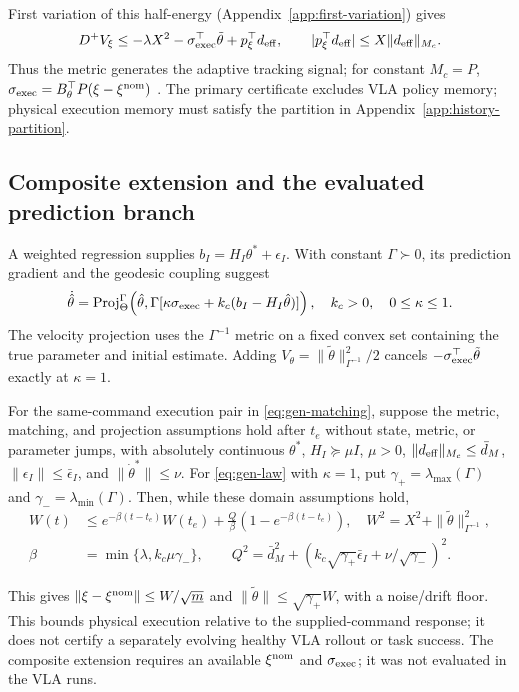 First variation of this half-energy (Appendix~\ref{app:first-variation})
gives
\begin{equation}
 D^+V_\xi\le-\lambda X^2-\sigma_{\rm exec}^\top\tilde\theta
                  +p_\xi^\top d_{\rm eff},\qquad
 |p_\xi^\top d_{\rm eff}|\le X\|d_{\rm eff}\|_{M_c}.
 \label{eq:gen-storage}
\end{equation}
Thus the metric generates the adaptive tracking signal; for constant
$M_c=P$, $\sigma_{\rm exec}=B_\theta^\top P(\xi-\xi^{\rm nom})$
\citep{lopez2020adaptivecontraction,tsukamoto2021adaptivecontraction}.
The primary certificate excludes VLA policy memory; physical execution
memory must satisfy the partition in Appendix~\ref{app:history-partition}.

\subsection{Composite extension and the evaluated prediction branch}
A weighted regression supplies $b_I=H_I\theta^*+\epsilon_I$.
With constant $\Gamma\succ0$, its prediction gradient and the geodesic
coupling suggest
\begin{equation}
 \dot{\hat\theta}=\operatorname{Proj}_{\Theta}^{\Gamma}
 \!\left(\hat\theta,\Gamma[\kappa\sigma_{\rm exec}+k_c(b_I-H_I\hat\theta)]\right),
 \quad k_c>0,\quad 0\le\kappa\le1.
 \label{eq:gen-law}
\end{equation}
The velocity projection uses the $\Gamma^{-1}$ metric on a fixed convex
set containing the true parameter and initial estimate. Adding
$V_\theta=\|\tilde\theta\|_{\Gamma^{-1}}^2/2$ cancels
$-\sigma_{\rm exec}^\top\tilde\theta$ exactly at $\kappa=1$.

\begin{theorem}
\label{thm:gen-adaptive}
For the same-command execution pair in \eqref{eq:gen-matching}, suppose
the metric, matching, and projection assumptions hold after $t_e$ without
state, metric, or parameter jumps, with absolutely continuous $\theta^*$, $H_I\succeq\mu I$, $\mu>0$,
$\|d_{\rm eff}\|_{M_c}\le\bar d_M$,
$\|\epsilon_I\|\le\bar\epsilon_I$, and
$\|\dot\theta^*\|\le\nu$. For \eqref{eq:gen-law} with $\kappa=1$, put
$\gamma_+=\lambda_{\max}(\Gamma)$ and $\gamma_-=\lambda_{\min}(\Gamma)$.
Then, while these domain assumptions hold,
\begin{align}
 W(t)&\le e^{-\beta(t-t_e)}W(t_e)+\frac Q\beta(1-e^{-\beta(t-t_e)}),
 \quad W^2=X^2+\|\tilde\theta\|_{\Gamma^{-1}}^2,
 \label{eq:gen-envelope}\\
 \beta&=\min\{\lambda,k_c\mu\gamma_-\},\qquad
 Q^2=\bar d_M^2+\left(k_c\sqrt{\gamma_+}\bar\epsilon_I+
                  \nu/\sqrt{\gamma_-}\right)^2.
 \label{eq:gen-forcing}
\end{align}
\end{theorem}
This gives $\|\xi-\xi^{\rm nom}\|\le W/\sqrt{\underline m}$ and
$\|\tilde\theta\|\le\sqrt{\gamma_+}W$, with a noise/drift floor.
This bounds physical execution relative to the supplied-command response;
it does not certify a separately evolving healthy VLA rollout or task
success. The composite extension requires an available $\xi^{\rm nom}$ and
$\sigma_{\rm exec}$; it was not evaluated in the VLA runs.

